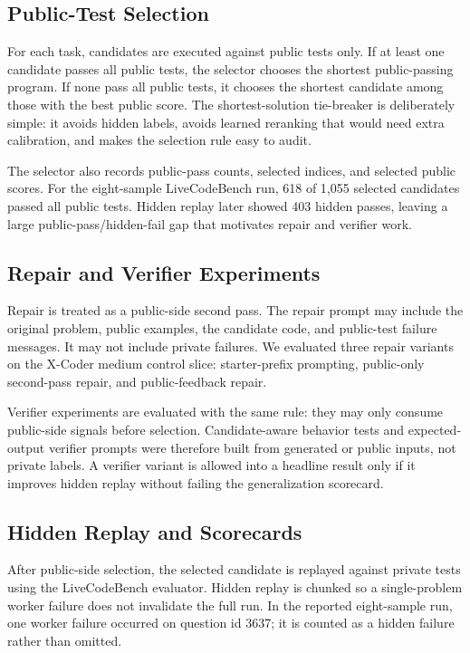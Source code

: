 \documentclass[11pt]{article}
\begin{document}
\subsection{Public-Test Selection}

For each task, candidates are executed against public tests only. If at least
one candidate passes all public tests, the selector chooses the shortest
public-passing program. If none pass all public tests, it chooses the shortest
candidate among those with the best public score. The shortest-solution
tie-breaker is deliberately simple: it avoids hidden labels, avoids learned
reranking that would need extra calibration, and makes the selection rule easy
to audit.

The selector also records public-pass counts, selected indices, and selected
public scores. For the eight-sample LiveCodeBench run, 618 of 1,055 selected
candidates passed all public tests. Hidden replay later showed 403 hidden
passes, leaving a large public-pass/hidden-fail gap that motivates repair and
verifier work.

\subsection{Repair and Verifier Experiments}

Repair is treated as a public-side second pass. The repair prompt may include
the original problem, public examples, the candidate code, and public-test
failure messages. It may not include private failures. We evaluated three
repair variants on the X-Coder medium control slice: starter-prefix prompting,
public-only second-pass repair, and public-feedback repair.

Verifier experiments are evaluated with the same rule: they may only consume
public-side signals before selection. Candidate-aware behavior tests and
expected-output verifier prompts were therefore built from generated or public
inputs, not private labels. A verifier variant is allowed into a headline result
only if it improves hidden replay without failing the generalization scorecard.

\subsection{Hidden Replay and Scorecards}

After public-side selection, the selected candidate is replayed against private
tests using the LiveCodeBench evaluator. Hidden replay is chunked so a
single-problem worker failure does not invalidate the full run. In the reported
eight-sample run, one worker failure occurred on question id 3637; it is counted
as a hidden failure rather than omitted.
\end{document}

